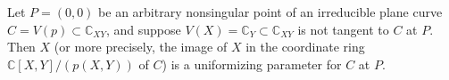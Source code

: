 Let $P = (0, 0)$ be an arbitrary nonsingular point of an irreducible plane curve $C = V(p) \subset \mathbb{C}_{XY}$, and suppose $V(X) = \mathbb{C}_Y \subset \mathbb{C}_{XY}$ is not tangent to $C$ at $P$. Then $X$ (or more precisely, the image of $X$ in the coordinate ring $\mathbb{C}[X, Y]/(p(X, Y))$ of $C$) is a uniformizing parameter for $C$ at $P$.
